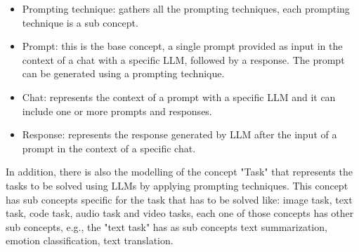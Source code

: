 \begin{itemize}
    \item Prompting technique: gathers all the prompting techniques, each prompting technique is a sub concept.

    \item Prompt: this is the base concept, a single prompt provided as input in the context of a chat with a specific LLM, followed by a response. The prompt can be generated using a prompting technique.

    \item Chat: represents the context of a prompt with a specific LLM and it can include one or more prompts and responses.

    \item Response: represents the response generated by LLM after the input of a prompt in the context of a specific chat.
\end{itemize}


In addition, there is also the modelling of the concept "Task" that represents the tasks to be solved using LLMs by applying prompting techniques.
This concept has sub concepts specific for the task that has to be solved like: image task, text task, code task, audio task and video tasks, each one of those concepts has other sub concepts, e.g., the "text task" has as sub concepts text summarization, emotion classification, text translation.

